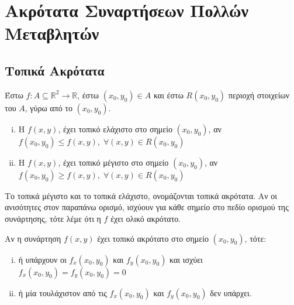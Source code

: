 


\everymath{\displaystyle}



\chapter{Ακρότατα Συναρτήσεων Πολλών Μεταβλητών}

\section{Τοπικά Ακρότατα}

\begin{dfn}
\item {}
    Έστω $ f \colon A \subseteq \mathbb{R}^{2} \to \mathbb{R} $, έστω 
    $ (x_{0}, y_{0}) \in A $ και έστω $R(x_{0}, y_{0}) $ περιοχή στοιχείων του $A$, 
    γύρω από το $ (x_{0}, y_{0}) $.
    \begin{enumerate}[i)]
        \item 
            Η $ f(x,y) $, έχει τοπικό ελάχιστο στο σημείο $ (x_{0}, y_{0}) $, αν 
            $ f(x_{0}, y_{0}) \leq f(x,y), \; \forall (x,y) \in R(x_{0}, y_{0}) $ 
        \item 
            Η $ f(x,y) $, έχει τοπικό μέγιστο στο σημείο $ (x_{0}, y_{0}) $, αν 
            $ f(x_{0}, y_{0}) \geq f(x,y), \; \forall (x,y) \in R(x_{0}, y_{0}) $ 
    \end{enumerate}
    Το τοπικά μέγιστο και το τοπικά ελάχιστο, ονομάζονται τοπικά ακρότατα. Αν οι 
    ανισότητες στον παραπάνω ορισμό, ισχύουν για κάθε σημείο στο πεδίο ορισμού
    της συνάρτησης, τότε λέμε ότι η $f$ έχει ολικό ακρότατο.
\end{dfn}

\begin{prop}
\item {}
    Αν η συνάρτηση $ f(x,y) $ έχει τοπικό ακρότατο στο σημείο $ (x_{0}, y_{0}) $, 
    τότε:
    \begin{enumerate}[i)]
        \item ή υπάρχουν οι $ f_{x}(x_{0}, y_{0}) $ και $ f_{y}(x_{0}, y_{0}) $ 
            και ισχύει $ f_{x}(x_{0}, y_{0}) = f_{y}(x_{0}, y_{0} )=0 $
        \item ή μία τουλάχιστον από τις $ f_{x}(x_{0}, y_{0}) $ και 
            $ f_{y}(x_{0}, y_{0}) $ δεν υπάρχει.
    \end{enumerate}
\end{prop}

